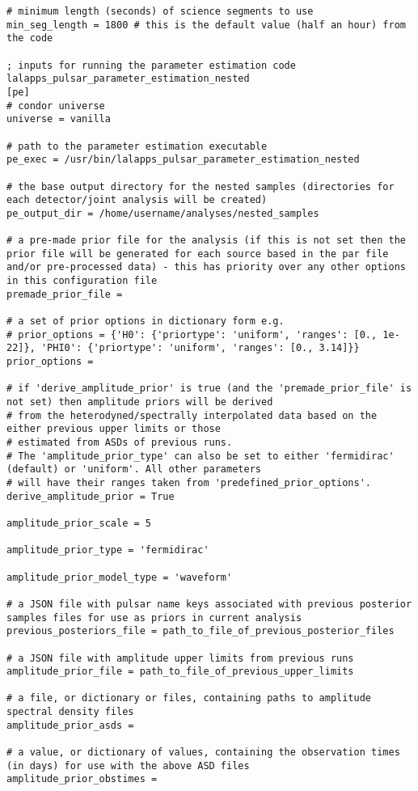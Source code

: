 \begin{lstlisting}[frame=single]
# minimum length (seconds) of science segments to use
min_seg_length = 1800 # this is the default value (half an hour) from the code

; inputs for running the parameter estimation code lalapps_pulsar_parameter_estimation_nested
[pe]
# condor universe
universe = vanilla

# path to the parameter estimation executable
pe_exec = /usr/bin/lalapps_pulsar_parameter_estimation_nested

# the base output directory for the nested samples (directories for each detector/joint analysis will be created)
pe_output_dir = /home/username/analyses/nested_samples

# a pre-made prior file for the analysis (if this is not set then the prior file will be generated for each source based in the par file and/or pre-processed data) - this has priority over any other options in this configuration file
premade_prior_file =

# a set of prior options in dictionary form e.g.
# prior_options = {'H0': {'priortype': 'uniform', 'ranges': [0., 1e-22]}, 'PHI0': {'priortype': 'uniform', 'ranges': [0., 3.14]}}
prior_options =

# if 'derive_amplitude_prior' is true (and the 'premade_prior_file' is not set) then amplitude priors will be derived
# from the heterodyned/spectrally interpolated data based on the either previous upper limits or those
# estimated from ASDs of previous runs.
# The 'amplitude_prior_type' can also be set to either 'fermidirac' (default) or 'uniform'. All other parameters
# will have their ranges taken from 'predefined_prior_options'.
derive_amplitude_prior = True

amplitude_prior_scale = 5

amplitude_prior_type = 'fermidirac'

amplitude_prior_model_type = 'waveform'

# a JSON file with pulsar name keys associated with previous posterior samples files for use as priors in current analysis
previous_posteriors_file = path_to_file_of_previous_posterior_files

# a JSON file with amplitude upper limits from previous runs
amplitude_prior_file = path_to_file_of_previous_upper_limits

# a file, or dictionary or files, containing paths to amplitude spectral density files
amplitude_prior_asds =

# a value, or dictionary of values, containing the observation times (in days) for use with the above ASD files
amplitude_prior_obstimes =


\end{lstlisting}
